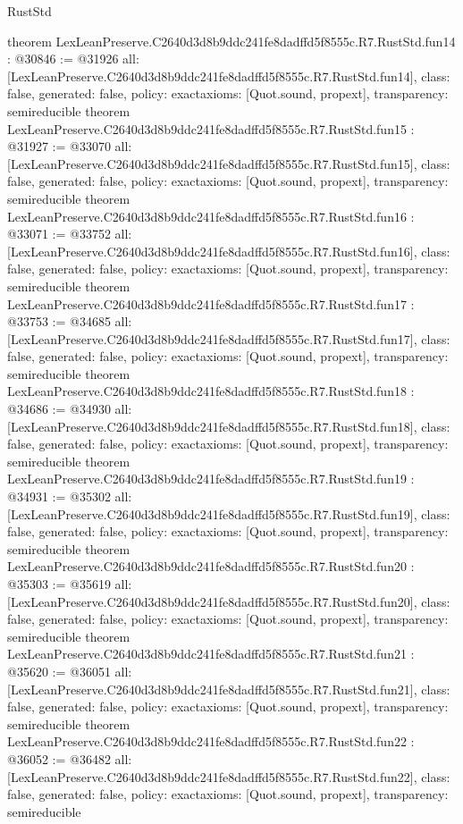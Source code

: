 \begin{lexlean}{RustStd}
\begin{coremodule}
{}
theorem LexLeanPreserve.C2640d3d8b9ddc241fe8dadffd5f8555c.R7.RustStd.fun14 : @30846 := @31926 {
  all: [LexLeanPreserve.C2640d3d8b9ddc241fe8dadffd5f8555c.R7.RustStd.fun14],
  class: false,
  generated: false,
  policy: exact{axioms: [Quot.sound, propext]},
  transparency: semireducible
}
theorem LexLeanPreserve.C2640d3d8b9ddc241fe8dadffd5f8555c.R7.RustStd.fun15 : @31927 := @33070 {
  all: [LexLeanPreserve.C2640d3d8b9ddc241fe8dadffd5f8555c.R7.RustStd.fun15],
  class: false,
  generated: false,
  policy: exact{axioms: [Quot.sound, propext]},
  transparency: semireducible
}
theorem LexLeanPreserve.C2640d3d8b9ddc241fe8dadffd5f8555c.R7.RustStd.fun16 : @33071 := @33752 {
  all: [LexLeanPreserve.C2640d3d8b9ddc241fe8dadffd5f8555c.R7.RustStd.fun16],
  class: false,
  generated: false,
  policy: exact{axioms: [Quot.sound, propext]},
  transparency: semireducible
}
theorem LexLeanPreserve.C2640d3d8b9ddc241fe8dadffd5f8555c.R7.RustStd.fun17 : @33753 := @34685 {
  all: [LexLeanPreserve.C2640d3d8b9ddc241fe8dadffd5f8555c.R7.RustStd.fun17],
  class: false,
  generated: false,
  policy: exact{axioms: [Quot.sound, propext]},
  transparency: semireducible
}
theorem LexLeanPreserve.C2640d3d8b9ddc241fe8dadffd5f8555c.R7.RustStd.fun18 : @34686 := @34930 {
  all: [LexLeanPreserve.C2640d3d8b9ddc241fe8dadffd5f8555c.R7.RustStd.fun18],
  class: false,
  generated: false,
  policy: exact{axioms: [Quot.sound, propext]},
  transparency: semireducible
}
theorem LexLeanPreserve.C2640d3d8b9ddc241fe8dadffd5f8555c.R7.RustStd.fun19 : @34931 := @35302 {
  all: [LexLeanPreserve.C2640d3d8b9ddc241fe8dadffd5f8555c.R7.RustStd.fun19],
  class: false,
  generated: false,
  policy: exact{axioms: [Quot.sound, propext]},
  transparency: semireducible
}
theorem LexLeanPreserve.C2640d3d8b9ddc241fe8dadffd5f8555c.R7.RustStd.fun20 : @35303 := @35619 {
  all: [LexLeanPreserve.C2640d3d8b9ddc241fe8dadffd5f8555c.R7.RustStd.fun20],
  class: false,
  generated: false,
  policy: exact{axioms: [Quot.sound, propext]},
  transparency: semireducible
}
theorem LexLeanPreserve.C2640d3d8b9ddc241fe8dadffd5f8555c.R7.RustStd.fun21 : @35620 := @36051 {
  all: [LexLeanPreserve.C2640d3d8b9ddc241fe8dadffd5f8555c.R7.RustStd.fun21],
  class: false,
  generated: false,
  policy: exact{axioms: [Quot.sound, propext]},
  transparency: semireducible
}
theorem LexLeanPreserve.C2640d3d8b9ddc241fe8dadffd5f8555c.R7.RustStd.fun22 : @36052 := @36482 {
  all: [LexLeanPreserve.C2640d3d8b9ddc241fe8dadffd5f8555c.R7.RustStd.fun22],
  class: false,
  generated: false,
  policy: exact{axioms: [Quot.sound, propext]},
  transparency: semireducible
}
\end{coremodule}
\end{lexlean}

